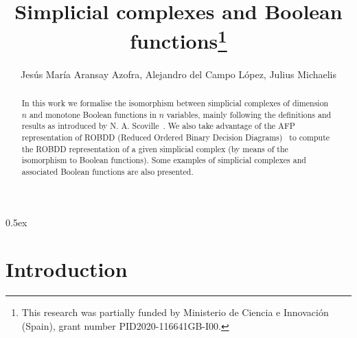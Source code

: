 \documentclass[11pt,a4paper]{article}
\begin{document}
\title{Simplicial complexes and Boolean functions\thanks{This research was partially funded by 
    Ministerio de Ciencia e Innovación (Spain),
    grant number PID2020-116641GB-I00.}}
\author{Jesús María Aransay Azofra, Alejandro del Campo López, Julius Michaelis}
\maketitle

\begin{abstract}
  In this work we formalise the isomorphism between 
  simplicial complexes of dimension $n$ and 
  monotone Boolean functions in $n$ variables, 
  mainly following the definitions and results
  as introduced by N. A. Scoville~\cite[Ch. 6]{SC19}.
  We also take advantage of the AFP representation
  of ROBDD (Reduced Ordered Binary Decision 
    Diagrams)~\cite{ROBDD-AFP}
  to compute the ROBDD representation 
  of a given simplicial complex (by means of the isomorphism
  to Boolean functions). Some examples of simplicial complexes 
  and associated Boolean functions are also presented.
\end{abstract}

\tableofcontents

\parindent 0pt\parskip 0.5ex

\section{Introduction}







\end{document}
